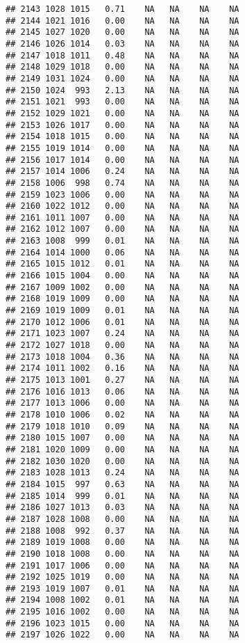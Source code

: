 \documentclass{article}\usepackage{graphicx, color}
\makeatletter
\newenvironment{kframe}{%
 \def\at@end@of@kframe{}%
 \ifinner\ifhmode%
  \def\at@end@of@kframe{\end{minipage}}%
  \begin{minipage}{\columnwidth}%
 \fi\fi%
 \def\FrameCommand##1{\hskip\@totalleftmargin \hskip-\fboxsep
 \colorbox{shadecolor}{##1}\hskip-\fboxsep
     \hskip-\linewidth \hskip-\@totalleftmargin \hskip\columnwidth}%
 \MakeFramed {\advance\hsize-\width
   \@totalleftmargin\z@ \linewidth\hsize
   \@setminipage}}%
 {\par\unskip\endMakeFramed%
 \at@end@of@kframe}
\newenvironment{knitrout}{}{} %
\makeatother
\begin{document}
\begin{knitrout}
\begin{kframe}
\begin{verbatim}
## 2143 1028 1015   0.71    NA   NA    NA    NA
## 2144 1021 1016   0.00    NA   NA    NA    NA
## 2145 1027 1020   0.00    NA   NA    NA    NA
## 2146 1026 1014   0.03    NA   NA    NA    NA
## 2147 1018 1011   0.48    NA   NA    NA    NA
## 2148 1029 1018   0.00    NA   NA    NA    NA
## 2149 1031 1024   0.00    NA   NA    NA    NA
## 2150 1024  993   2.13    NA   NA    NA    NA
## 2151 1021  993   0.00    NA   NA    NA    NA
## 2152 1029 1021   0.00    NA   NA    NA    NA
## 2153 1026 1017   0.00    NA   NA    NA    NA
## 2154 1018 1015   0.00    NA   NA    NA    NA
## 2155 1019 1014   0.00    NA   NA    NA    NA
## 2156 1017 1014   0.00    NA   NA    NA    NA
## 2157 1014 1006   0.24    NA   NA    NA    NA
## 2158 1006  998   0.74    NA   NA    NA    NA
## 2159 1023 1006   0.00    NA   NA    NA    NA
## 2160 1022 1012   0.00    NA   NA    NA    NA
## 2161 1011 1007   0.00    NA   NA    NA    NA
## 2162 1012 1007   0.00    NA   NA    NA    NA
## 2163 1008  999   0.01    NA   NA    NA    NA
## 2164 1014 1000   0.06    NA   NA    NA    NA
## 2165 1015 1012   0.01    NA   NA    NA    NA
## 2166 1015 1004   0.00    NA   NA    NA    NA
## 2167 1009 1002   0.00    NA   NA    NA    NA
## 2168 1019 1009   0.00    NA   NA    NA    NA
## 2169 1019 1009   0.01    NA   NA    NA    NA
## 2170 1012 1006   0.01    NA   NA    NA    NA
## 2171 1023 1007   0.24    NA   NA    NA    NA
## 2172 1027 1018   0.00    NA   NA    NA    NA
## 2173 1018 1004   0.36    NA   NA    NA    NA
## 2174 1011 1002   0.16    NA   NA    NA    NA
## 2175 1013 1001   0.27    NA   NA    NA    NA
## 2176 1016 1013   0.06    NA   NA    NA    NA
## 2177 1013 1006   0.00    NA   NA    NA    NA
## 2178 1010 1006   0.02    NA   NA    NA    NA
## 2179 1018 1010   0.09    NA   NA    NA    NA
## 2180 1015 1007   0.00    NA   NA    NA    NA
## 2181 1020 1009   0.00    NA   NA    NA    NA
## 2182 1030 1020   0.00    NA   NA    NA    NA
## 2183 1028 1013   0.24    NA   NA    NA    NA
## 2184 1015  997   0.63    NA   NA    NA    NA
## 2185 1014  999   0.01    NA   NA    NA    NA
## 2186 1027 1013   0.03    NA   NA    NA    NA
## 2187 1028 1008   0.00    NA   NA    NA    NA
## 2188 1008  992   0.37    NA   NA    NA    NA
## 2189 1019 1008   0.00    NA   NA    NA    NA
## 2190 1018 1008   0.00    NA   NA    NA    NA
## 2191 1017 1006   0.00    NA   NA    NA    NA
## 2192 1025 1019   0.00    NA   NA    NA    NA
## 2193 1019 1007   0.01    NA   NA    NA    NA
## 2194 1008 1002   0.01    NA   NA    NA    NA
## 2195 1016 1002   0.00    NA   NA    NA    NA
## 2196 1023 1015   0.00    NA   NA    NA    NA
## 2197 1026 1022   0.00    NA   NA    NA    NA

\end{verbatim}
\end{kframe}
\end{knitrout}
\end{document}

